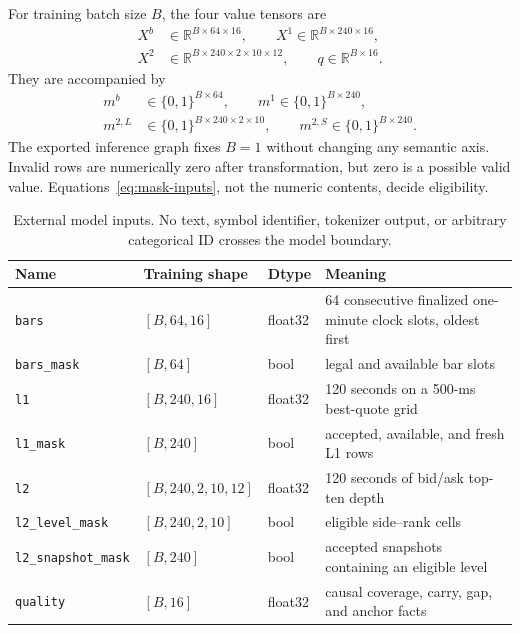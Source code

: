 \documentclass[10pt,letterpaper]{article}
\numberwithin{equation}{section}
\newcommand{\R}{\mathbb{R}}
\theoremstyle{definition}
\theoremstyle{remark}
\begin{document}
For training batch size $B$, the four value tensors are
\begin{equation}
\begin{split}
X^b&\in\R^{B\times64\times16},\qquad
X^1\in\R^{B\times240\times16},\\
X^2&\in\R^{B\times240\times2\times10\times12},\qquad
q\in\R^{B\times16}.
\end{split}
\label{eq:value-inputs}
\end{equation}
They are accompanied by
\begin{equation}
\begin{split}
m^b&\in\{0,1\}^{B\times64},\qquad
m^1\in\{0,1\}^{B\times240},\\
m^{2,L}&\in\{0,1\}^{B\times240\times2\times10},\qquad
m^{2,S}\in\{0,1\}^{B\times240}.
\end{split}
\label{eq:mask-inputs}
\end{equation}
The exported inference graph fixes $B=1$ without changing any semantic axis.
Invalid rows are numerically zero after transformation, but zero is a possible
valid value. Equations~\eqref{eq:mask-inputs}, not the numeric contents, decide
eligibility.

\begin{table}[!htbp]
\centering
\small
\begin{tabularx}{\textwidth}{@{}l l l Y@{}}
\toprule
\textbf{Name} & \textbf{Training shape} & \textbf{Dtype} & \textbf{Meaning}\\
\midrule
\texttt{bars} & $[B,64,16]$ & float32 & 64 consecutive finalized one-minute clock slots, oldest first\\
\texttt{bars\_mask} & $[B,64]$ & bool & legal and available bar slots\\
\texttt{l1} & $[B,240,16]$ & float32 & 120 seconds on a 500-ms best-quote grid\\
\texttt{l1\_mask} & $[B,240]$ & bool & accepted, available, and fresh L1 rows\\
\texttt{l2} & $[B,240,2,10,12]$ & float32 & 120 seconds of bid/ask top-ten depth\\
\texttt{l2\_level\_mask} & $[B,240,2,10]$ & bool & eligible side--rank cells\\
\texttt{l2\_snapshot\_mask} & $[B,240]$ & bool & accepted snapshots containing an eligible level\\
\texttt{quality} & $[B,16]$ & float32 & causal coverage, carry, gap, and anchor facts\\
\bottomrule
\end{tabularx}
\caption{External model inputs. No text, symbol identifier, tokenizer output,
or arbitrary categorical ID crosses the model boundary.}
\label{tab:external-inputs}
\end{table}
\end{document}
